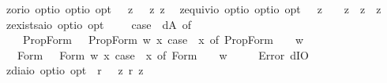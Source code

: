\begin{isabellebody}
\isamarkupfalse%
\ z{\isacharunderscore}or{\isacharcolon}{\isacharcolon}{\isachardoublequoteopen}io\ opt{\isasymRightarrow}io\ opt{\isasymRightarrow}io\ opt{\isachardoublequoteclose}\ \ {\isachardoublequoteopen}{\isasymphi}\ {\isasymor}\isactrlsup z\ {\isasympsi}\ {\isasymequiv}\ {\isacharparenleft}{\isasymnot}\isactrlsup z{\isasymphi}\ {\isasymrightarrow}\isactrlsup z\ {\isasympsi}{\isacharparenright}{\isachardoublequoteclose}\isanewline
{}\isamarkupfalse%
\ z{\isacharunderscore}equiv{\isacharcolon}{\isacharcolon}{\isachardoublequoteopen}io\ opt{\isasymRightarrow}io\ opt{\isasymRightarrow}io\ opt{\isachardoublequoteclose}\ \ {\isachardoublequoteopen}{\isasymphi}\ {\isasymequiv}\isactrlsup z\ {\isasympsi}\ {\isasymequiv}\ {\isacharparenleft}{\isasymphi}\ {\isasymrightarrow}\isactrlsup z\ {\isasympsi}{\isacharparenright}\ {\isasymand}\isactrlsup z\ {\isacharparenleft}{\isasympsi}\ {\isasymrightarrow}\isactrlsup z\ {\isasymphi}{\isacharparenright}{\isachardoublequoteclose}\isanewline
{}\isamarkupfalse%
\ z{\isacharunderscore}exists{\isacharcolon}{\isacharcolon}{\isachardoublequoteopen}{\isacharparenleft}{\isacharprime}a{\isasymRightarrow}io\ opt{\isacharparenright}{\isasymRightarrow}io\ opt{\isachardoublequoteclose}\ \ {\isachardoublequoteopen}{\isasymexists}\ {\isasymPhi}\ {\isasymequiv}\ case\ {\isacharparenleft}{\isasymPhi}\ dA{\isacharparenright}\ of\isanewline
\ \ \ \ PropForm\ {\isasymphi}\ {\isasymRightarrow}\ PropForm\ {\isacharparenleft}{\isasymlambda}w{\isachardot}\ {\isasymexists}x{\isachardot}\ case\ {\isacharparenleft}{\isasymPhi}\ x{\isacharparenright}\ of\ PropForm\ {\isasympsi}\ {\isasymRightarrow}\ {\isasympsi}\ w{\isacharparenright}\isanewline
\ \ {\isacharbar}\ Form\ {\isasymphi}\ {\isasymRightarrow}\ Form\ {\isacharparenleft}{\isasymlambda}w{\isachardot}\ {\isasymexists}x{\isachardot}\ case\ {\isacharparenleft}{\isasymPhi}\ x{\isacharparenright}\ of\ Form\ {\isasympsi}\ {\isasymRightarrow}\ {\isasympsi}\ w{\isacharparenright}\isanewline
\ \ {\isacharbar}\ {\isacharunderscore}\ {\isasymRightarrow}\ Error\ dIO{\isachardoublequoteclose}\isanewline
{}\isamarkupfalse%
\ z{\isacharunderscore}dia{\isacharcolon}{\isacharcolon}{\isachardoublequoteopen}io\ opt{\isasymRightarrow}io\ opt{\isachardoublequoteclose}\ \ {\isachardoublequoteopen}{\isasymdiamond}\isactrlsup r\ {\isasymphi}\ {\isasymequiv}\ {\isasymnot}\isactrlsup z\ {\isasymbox}\isactrlsup r\ {\isacharparenleft}{\isasymnot}\isactrlsup z\ {\isasymphi}{\isacharparenright}{\isachardoublequoteclose}%

\end{isabellebody}
